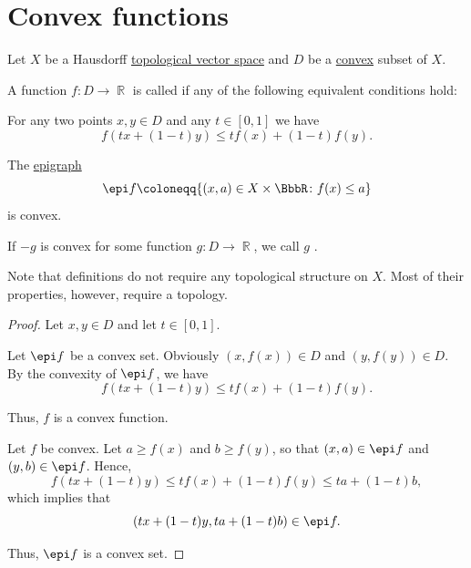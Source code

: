 \section{Convex functions}\label{sec:convex_functions}

Let \( X \) be a Hausdorff \hyperref[def:topological_vector_space]{topological vector space} and \( D \) be a \hyperref[def:convex_hull]{convex} subset of \( X \).

\begin{definition}\label{def:convex_function}
  A function \( f: D \to \BbbR \) is called  if any of the following equivalent conditions hold:

  \begin{thmenum}
     For any two points \( x, y \in D \) and any \( t \in [0, 1] \) we have
    \begin{equation*}
      f(tx + (1-t)y) \leq tf(x) + (1-t)f(y).
    \end{equation*}

     The \hyperref[def:epigraph]{epigraph}
    \begin{equation*}
      \epi f \coloneqq \{ (x, a) \in X \times \BbbR \colon f(x) \leq a \}
    \end{equation*}
    is convex.
  \end{thmenum}

  If \( -g \) is convex for some function \( g: D \to \BbbR \), we call \( g \) .

  Note that definitions do not require any topological structure on \( X \). Most of their properties, however, require a topology.
\end{definition}
\begin{proof}
  Let \( x, y \in D \) and let \( t \in [0, 1] \).

   Let \( \epi f \) be a convex set. Obviously \( (x, f(x)) \in D \) and \( (y, f(y)) \in D \). By the convexity of \( \epi f \), we have
  \begin{equation*}
    f(tx + (1-t)y) \leq tf(x) + (1-t)f(y).
  \end{equation*}

  Thus, \( f \) is a convex function.

   Let \( f \) be convex. Let \( a \geq f(x) \) and \( b \geq f(y) \), so that \( (x, a) \in \epi f \) and \( (y, b) \in \epi f \). Hence,
  \begin{equation*}
    f(tx + (1-t)y) \leq tf(x) + (1-t)f(y) \leq ta + (1-t)b,
  \end{equation*}
  which implies that
  \begin{equation*}
    (tx + (1-t)y, ta + (1-t)b) \in \epi f.
  \end{equation*}

  Thus, \( \epi f \) is a convex set.
\end{proof}

